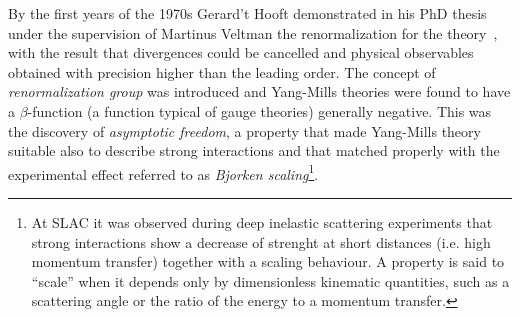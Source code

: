 By the first years of the 1970s Gerard't Hooft demonstrated in his
PhD thesis under the supervision of  Martinus Veltman the
renormalization for the theory~\cite{tHooft1971173,Hooft1971167}, 
with the result that divergences could be 
cancelled and physical observables obtained with precision higher than the 
leading order. 
The concept of \textit{renormalization group} was introduced and 
Yang-Mills theories were found to have a $\beta$-function (a function 
typical of gauge theories) generally negative. This was the discovery 
of \textit{asymptotic freedom}, a property that made Yang-Mills theory 
suitable also to describe strong interactions and that matched properly 
with the experimental effect referred to as \textit{Bjorken scaling}\footnote{At 
SLAC it was observed during deep inelastic scattering experiments that 
strong interactions show a decrease of strenght at short distances (i.e. 
high momentum transfer) together with a scaling behaviour. A property is 
said to ``scale'' when it depends only by dimensionless kinematic quantities, 
such as a scattering angle or the ratio of the energy to a momentum transfer.}. 

